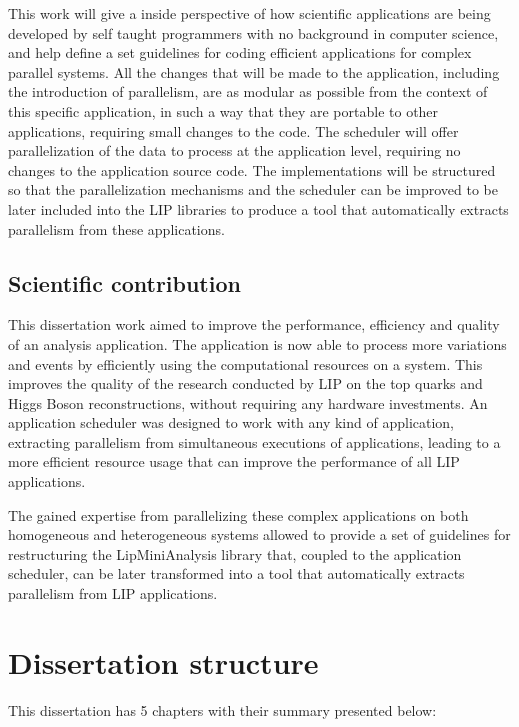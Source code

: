 This work will give a inside perspective of how scientific applications are being developed by self taught programmers with no background in computer science, and help define a set guidelines for coding efficient applications for complex parallel systems. All the changes that will be made to the \tth application, including the introduction of parallelism, are as modular as possible from the context of this specific application, in such a way that they are portable to other applications, requiring small changes to the code. The scheduler will offer parallelization of the data to process at the application level, requiring no changes to the application source code. The implementations will be structured so that the parallelization mechanisms and the scheduler can be improved to be later included into the LIP libraries to produce a tool that automatically extracts parallelism from these applications.

\subsection{Scientific contribution}
\label{ScientificContribution}

This dissertation work aimed to improve the performance, efficiency and quality of an analysis application. The application is now able to process more variations and events by efficiently using the computational resources on a system. This improves the quality of the research conducted by LIP on the top quarks and Higgs Boson reconstructions, without requiring any hardware investments. An application scheduler was designed to work with any kind of application, extracting parallelism from simultaneous executions of applications, leading to a more efficient resource usage that can improve the performance of all LIP applications.

The gained expertise from parallelizing these complex applications on both homogeneous and heterogeneous systems allowed to provide a set of guidelines for restructuring the LipMiniAnalysis library that, coupled to the application scheduler, can be later transformed into a tool that automatically extracts parallelism from LIP applications.

\section{Dissertation structure}
\label{DissertationStructure}

This dissertation has 5 chapters with their summary presented below:

